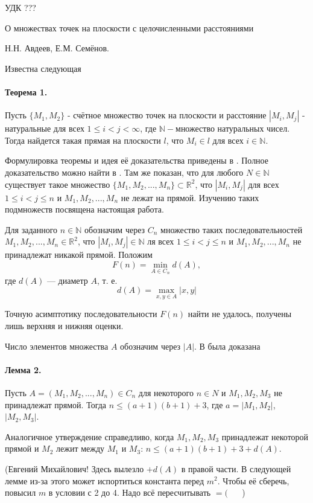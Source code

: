 \documentclass[a4paper,14pt]{article} %
\begin{document}
\large


УДК ???

О множествах точек на плоскости с целочисленными расстояниями

Н.Н. Авдеев, Е.М. Семёнов.


Известна следующая

\paragraph{Теорема 1.} Пусть $\{M_1,M_2\}$ - счётное множество точек на плоскости и расстояние $|M_i,M_j|$ - натуральные для всех $1\leq i < j <\infty$, где $\mathbb{N} - $множество натуральных чисел. Тогда найдется такая прямая на плоскости $l$, что $M_i\in l$ для всех $i \in \mathbb{N}$.

Формулировка теоремы и идея её доказательства приведены в \cite{Newman}. Полное доказательство можно найти в \cite{angem1kurs}. Там же показан, что для любого $N\in \mathbb{N}$ существует такое множество $\{M_1,M_2,...,M_n\}\subset \mathbb{R}^2$, что $|M_i,M_j|$ для всех $1\leq i < j  \leq n$ и $M_1, M_2, ..., M_n$ не лежат на прямой. Изучению таких подмножеств посвящена настоящая работа.


Для заданного $n\in \mathbb{N}$ обозначим через $C_n$ множество таких последовательностей $M_1,M_2,...,M_n \in \mathbb{R}^2$, что $|M_i,M_j|\in\mathbb{N}$ ля всех $1\leq i < j  \leq n$ и  $M_1,M_2,...,M_n$ не принадлежат никакой прямой. Положим
$$
F(n)=\min\limits_{A\in C_n} d(A),
$$
где $d(A)$ --- диаметр $A$, т. е.
$$
d(A)=\max\limits_{x,y\in A}|x,y|
$$

Точную асимптотику последовательности  $F(n)$ найти не удалось, получены лишь верхняя и нижняя оценки.

Число элементов множества $A$ обозначим через $|A|$.
В \cite{angem1kurs} была доказана

\paragraph{Лемма 2.}

Пусть $A=(M_1, M_2, ..., M_n) \in C_n$ для некоторого $n\in N$ и $M_1, M_2, M_3$ не принадлежат прямой.
Тогда $n\leq (a+1)(b+1)+3$, где $a=|M_1,M_2|$, $|M_2,M_3|$.

Аналогичное утверждение справедливо, когда $M_1,M_2,M_3$ принадлежат некоторой прямой и $M_2$ лежит между $M_1$ и $M_3$:
$n\leq (a+1)(b+1)+3+d(A)$.



(Евгений Михайлович! Здесь вылезло $+d(A)$ в правой части.
В следующей лемме из-за этого может испортиться константа перед $m^2$.
Чтобы её сберечь, повысил $m$ в условии с 2 до 4.
Надо всё пересчитывать $=($ ~~ )
\end{document}
